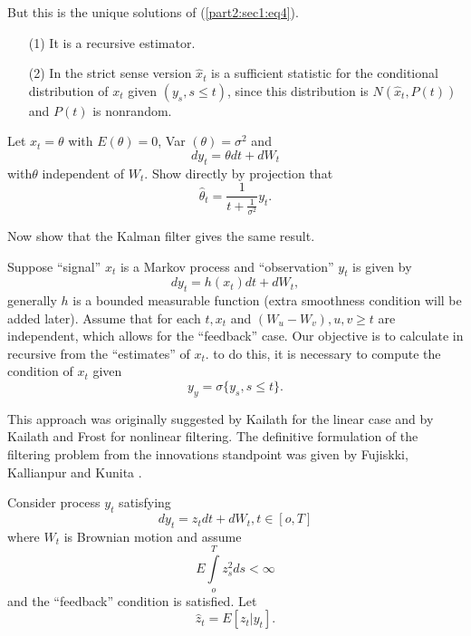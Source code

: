  But this is the unique solutions of (\ref{part2:sec1:eq4}).
  
\medskip
{}
\begin{itemize}
\item[\rm (1)] It is a recursive estimator. 

\item[\rm (2)] In the strict sense version $\hat{x}_t$ is a sufficient
  statistic for the conditional distribution of $x_t$ given $(y_s, s
  \le t)$, since this distribution is $N(\hat{x}_t, P(t))$ and $P(t)$
  is nonrandom.  
\end{itemize}
  
  \begin{exercise} %
      Let $x_t = \theta$ with $E(\theta)=0$, Var
    $(\theta)= \sigma^2$ and  
    $$
    dy_t= \theta dt + dW_t 
    $$  
    with\pageoriginale $\theta$ independent of $W_t$. Show directly by
    projection that   
    $$
    \hat{\theta}_t =\frac{1}{t+ \frac{1}{\sigma^2}} y_t.
    $$  
  \end{exercise} 

Now show that the Kalman filter gives the same result.
 
\medskip
 
 Suppose ``signal'' $x_t$ is a Markov process and ``observation''
 $y_t$ is given by  
 $$
 dy_t = h(x_t)dt +dW_t,
 $$
 generally $h$ is a bounded measurable function (extra smoothness
 condition will be added later). Assume that for each $t,x_t$ and
 $(W_u- W_v), u,v \ge t$ are independent, which allows for the
 ``feedback'' case. Our objective is to calculate in recursive from
 the ``estimates'' of $x_t$. to do this, it is necessary to compute the
 condition of $x_t$ given  
 $$
 y_y = \sigma \{y_s, s \le t\}.
 $$
 
\medskip
 
 This approach was originally suggested by Kailath for the linear case
 and by Kailath and Frost for nonlinear filtering. The definitive
 formulation of the filtering problem from the innovations standpoint
 was given by Fujiskki, Kallianpur and Kunita \cite{key18}. 
 
\medskip
 \pageoriginale
 Consider process $y_t$ satisfying  
 \begin{equation*}
   dy_t =z_t dt+ dW_t,  t \in  [o,T] \tag{5}\label{part2:sec1:eq5}
 \end{equation*} 
 where $W_t$ is Brownian motion and assume
 \begin{equation*}
   E \int\limits_{o}^T z^2_s ds< \infty \tag{6}\label{part2:sec1:eq6}
\end{equation*} 
and the ``feedback'' condition is satisfied. Let 
$$
\hat{z}_t = E[z_t |y_t].
$$

